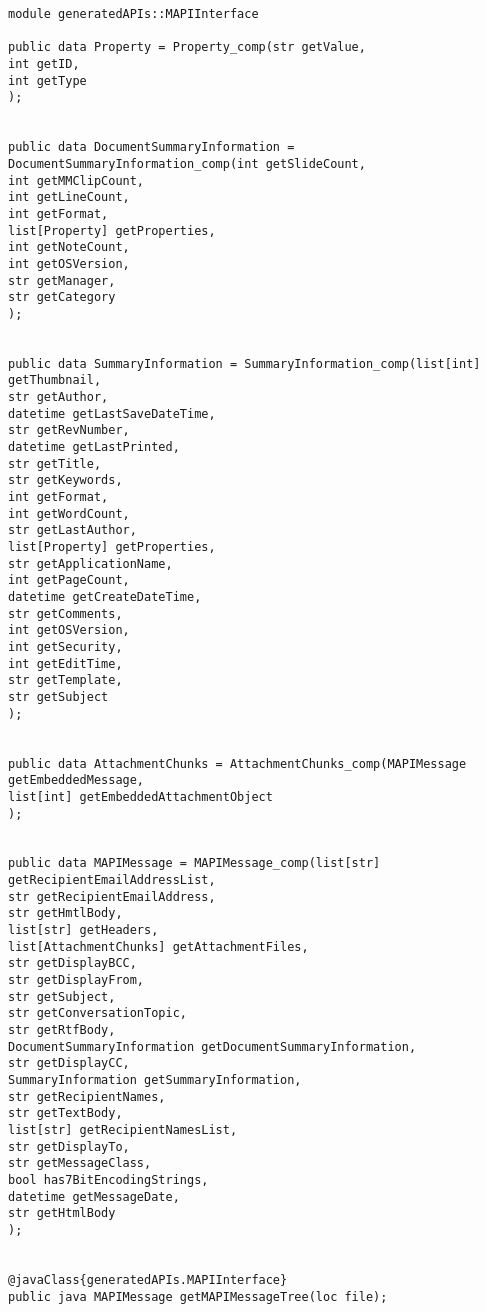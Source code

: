 \begin{lstlisting}[label=lst:mapiInterface,caption=The generated ADT corresponding to HSMF data structure.]
module generatedAPIs::MAPIInterface

public data Property = Property_comp(str getValue,
int getID,
int getType
);


public data DocumentSummaryInformation = DocumentSummaryInformation_comp(int getSlideCount,
int getMMClipCount,
int getLineCount,
int getFormat,
list[Property] getProperties,
int getNoteCount,
int getOSVersion,
str getManager,
str getCategory
);


public data SummaryInformation = SummaryInformation_comp(list[int] getThumbnail,
str getAuthor,
datetime getLastSaveDateTime,
str getRevNumber,
datetime getLastPrinted,
str getTitle,
str getKeywords,
int getFormat,
int getWordCount,
str getLastAuthor,
list[Property] getProperties,
str getApplicationName,
int getPageCount,
datetime getCreateDateTime,
str getComments,
int getOSVersion,
int getSecurity,
int getEditTime,
str getTemplate,
str getSubject
);


public data AttachmentChunks = AttachmentChunks_comp(MAPIMessage getEmbeddedMessage,
list[int] getEmbeddedAttachmentObject
);


public data MAPIMessage = MAPIMessage_comp(list[str] getRecipientEmailAddressList,
str getRecipientEmailAddress,
str getHmtlBody,
list[str] getHeaders,
list[AttachmentChunks] getAttachmentFiles,
str getDisplayBCC,
str getDisplayFrom,
str getSubject,
str getConversationTopic,
str getRtfBody,
DocumentSummaryInformation getDocumentSummaryInformation,
str getDisplayCC,
SummaryInformation getSummaryInformation,
str getRecipientNames,
str getTextBody,
list[str] getRecipientNamesList,
str getDisplayTo,
str getMessageClass,
bool has7BitEncodingStrings,
datetime getMessageDate,
str getHtmlBody
);


@javaClass{generatedAPIs.MAPIInterface}
public java MAPIMessage getMAPIMessageTree(loc file);
\end{lstlisting}